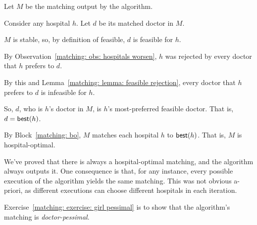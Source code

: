 \documentclass[11pt]{article}
\begin{document}
\begin{longFormProof}
  \step Let $M$ be the matching output by the algorithm.

  \begin{block}[matching: bo]
    \step Consider any hospital $h$.  Let $d$ be its matched doctor in $M$.  

    \step $M$ is stable, so, by definition of feasible, $d$ is feasible for $h$.

    \step By Observation~\ref{matching: obs: hospitals worsen}, $h$ was rejected by every doctor
    that $h$ prefers to $d$.

    \step By this and Lemma~\ref{matching: lemma: feasible rejection}, every doctor that $h$ prefers to $d$
    is infeasible for $h$.

    \step So, $d$, who is $h$'s doctor in $M$, is $h$'s most-preferred feasible doctor.  That is, $d = \text{\sf best}(h)$.
  \end{block}

  \step By Block~\ref{matching: bo}, $M$ matches each hospital $h$ to $\text{\sf best}(h)$.
  That is, $M$ is hospital-optimal.
\end{longFormProof}

We've proved that there is always a hospital-optimal matching, and the algorithm always outputs it.
One consequence is that, for any instance, every possible execution of the algorithm yields the same matching.
This was not obvious a-priori, as different executions can choose different hospitals in each iteration.

Exercise~\ref{matching: exercise: girl pessimal} is to show that the algorithm's matching is \emph{doctor-pessimal}.



\continued
\end{document}
